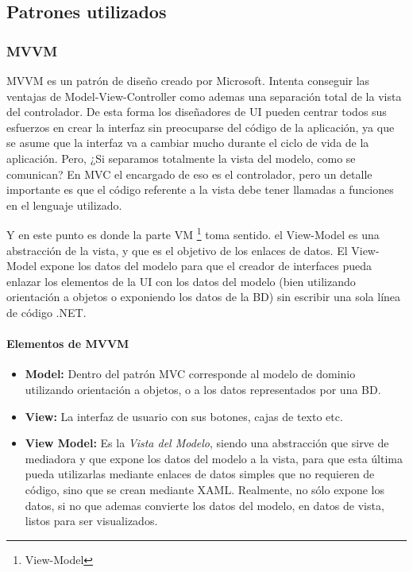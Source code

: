 \subsection{Patrones utilizados}

\subsubsection{MVVM}
MVVM es un patr\'{o}n de dise\~{n}o creado por Microsoft. Intenta conseguir las ventajas de Model-View-Controller como ademas una separaci\'{o}n total
de la vista del controlador. De esta forma los dise\~{n}adores de UI pueden centrar todos sus esfuerzos en crear la interfaz sin preocuparse 
del c\'{o}digo de la aplicaci\'{o}n, ya que se asume que la interfaz va a cambiar mucho durante el ciclo de vida de la aplicaci\'{o}n. Pero,
¿Si separamos totalmente la vista del modelo, como se comunican? En MVC el encargado de eso es el controlador, pero un detalle importante es 
que el c\'{o}digo referente a la vista debe tener llamadas a funciones en el lenguaje utilizado.

Y en este punto es donde la parte VM \footnote{View-Model} toma sentido. el View-Model es una abstracci\'{o}n de la vista, y que es el objetivo 
de los enlaces de datos. El View-Model expone los datos del modelo para que el creador de interfaces pueda enlazar los elementos de la UI
con los datos del modelo (bien utilizando orientaci\'{o}n a objetos o exponiendo los datos de la BD) sin escribir una sola l\'{i}nea de 
c\'{o}digo .NET.

\paragraph{Elementos de MVVM}

\begin{itemize}
    \item \textbf{Model:} Dentro del patr\'{o}n MVC corresponde al modelo de dominio utilizando orientaci\'{o}n a objetos, o a los datos
    representados por una BD.
    \item \textbf{View:} La interfaz de usuario con sus botones, cajas de texto etc.
    \item \textbf{View Model:} Es la \emph{Vista del Modelo}, siendo una abstracci\'{o}n que sirve de mediadora y que expone los datos
    del modelo a la vista, para que esta \'{u}ltima pueda utilizarlas mediante enlaces de datos simples que no requieren de c\'{o}digo, sino
    que se crean mediante XAML. Realmente, no s\'{o}lo expone los datos, si no que ademas convierte los datos del modelo, en datos de vista, listos
    para ser visualizados.
\end{itemize}


